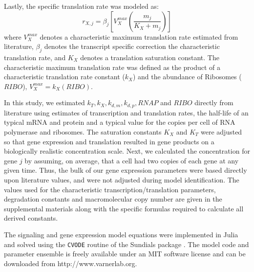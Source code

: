 \documentclass[11pt,letterpaper]{article}
\begin{document}
Lastly, the specific translation rate was modeled as:
\begin{equation}
	r_{X,j} = \beta_{j}\left[V^{max}_{X}\left(\frac{m_{j}}{K_{X}+m_{j}}\right)\right]
\end{equation}where $V^{max}_{X}$ denotes a characteristic maximum translation rate estimated from literature, $\beta_{j}$ denotes the transcript specific correction the characteristic translation rate,
and $K_{X}$ denotes a translation saturation constant.
The characteristic maximum translation rate was defined as the product of a characteristic translation rate constant ($k_{X}$)
and the abundance of Ribosomes ($RIBO$), $V^{max}_{X} = k_{X}\left(RIBO\right)$.

In this study, we estimated $k_{T}, k_{X}, k_{d,m}, k_{d,p}, RNAP$ and $RIBO$ directly from literature using estimates of transcription and translation rates,
the half-life of an typical mRNA and protein and a typical value for the copies per cell of RNA polymerase and ribosomes.
The saturation constants $K_{X}$ and $K_{T}$ were adjusted so that gene expression and translation resulted in gene products on a biologically realistic concentration scale.
Next, we calculated the concentration for gene $j$ by assuming, on average,
that a cell had two copies of each gene at any given time. Thus, the bulk of our gene expression parameters were based directly upon literature values, and were not adjusted during model identification. The values used for the characteristic transcription/translation parameters, degradation constants and macromolecular copy number are given in the supplemental materials along with the specific formulas required to calculate all derived constants.

The signaling and gene expression model equations were implemented in Julia and solved using the \texttt{CVODE} routine of the Sundials package \cite{Julia,Hindmarsh2005}.
The model code and parameter ensemble is freely available under an MIT software license and can be downloaded from http://www.varnerlab.org.
\end{document}
